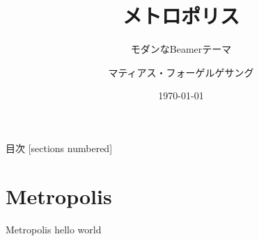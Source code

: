 \documentclass[10pt, aspectratio=169]{beamer}
\title{メトロポリス}
\subtitle{モダンなBeamerテーマ}
\date{\today}
\author{マティアス・フォーゲルゲサング}
\institute{モダンなBeamerテーマのセンター}
\begin{document}
\maketitle

\begin{frame}{目次}
    [sections numbered]
    \tableofcontents[hideallsubsections]
\end{frame}

\section{Metropolis}

\begin{frame}[fragile]{Metropolis}
    hello world
\end{frame}
\end{document}
